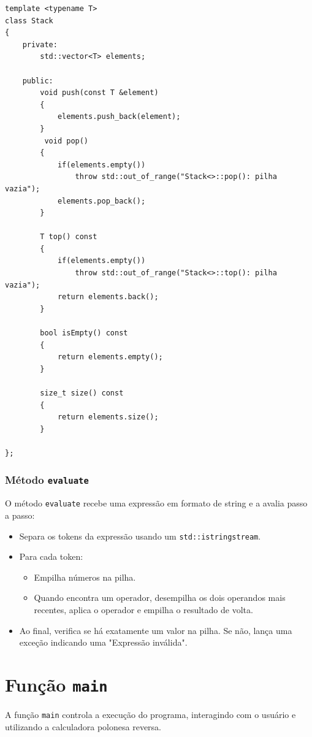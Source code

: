 \documentclass[a4paper,12pt]{article}
\begin{document}
\begin{minipage}{\linewidth}
\begin{lstlisting}[caption={Implementação da classe \texttt{Stack}}, label={lst:stack}]
template <typename T>
class Stack
{
    private:
        std::vector<T> elements;

    public:
        void push(const T &element)
        {
            elements.push_back(element);
        }
         void pop()
        {
            if(elements.empty())
                throw std::out_of_range("Stack<>::pop(): pilha vazia");
            elements.pop_back();
        }

        T top() const
        {
            if(elements.empty())
                throw std::out_of_range("Stack<>::top(): pilha vazia");
            return elements.back();
        }

        bool isEmpty() const
        {
            return elements.empty();
        }

        size_t size() const
        {
            return elements.size();
        }

};

\end{lstlisting}
\end{minipage}
\subsubsection{Método \texttt{evaluate}}
O método \texttt{evaluate} recebe uma expressão em formato de string e a avalia passo a passo:
\begin{itemize}
    \item Separa os tokens da expressão usando um \texttt{std::istringstream}.
    \item Para cada token:
      \begin{itemize}
        \item Empilha números na pilha.
        \item Quando encontra um operador, desempilha os dois operandos mais recentes, aplica o operador e empilha o resultado de volta.
      \end{itemize}
    \item Ao final, verifica se há exatamente um valor na pilha. Se não, lança uma exceção indicando uma "Expressão inválida".
\end{itemize}
\newpage
\section{Função \texttt{main}}
A função \texttt{main} controla a execução do programa, interagindo com o usuário e utilizando a calculadora polonesa reversa.
\end{document}
